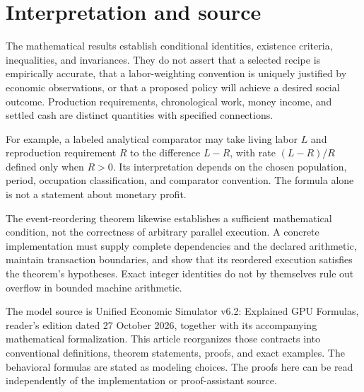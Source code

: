 \documentclass[11pt,a4paper]{article}
\begin{document}
\section{Interpretation and source}
The mathematical results establish conditional identities, existence criteria, inequalities, and invariances. They do not assert that a selected recipe is empirically accurate, that a labor-weighting convention is uniquely justified by economic observations, or that a proposed policy will achieve a desired social outcome. Production requirements, chronological work, money income, and settled cash are distinct quantities with specified connections.

For example, a labeled analytical comparator may take living labor $L$ and reproduction requirement $R$ to the difference $L-R$, with rate $(L-R)/R$ defined only when $R>0$. Its interpretation depends on the chosen population, period, occupation classification, and comparator convention. The formula alone is not a statement about monetary profit.

The event-reordering theorem likewise establishes a sufficient mathematical condition, not the correctness of arbitrary parallel execution. A concrete implementation must supply complete dependencies and the declared arithmetic, maintain transaction boundaries, and show that its reordered execution satisfies the theorem's hypotheses. Exact integer identities do not by themselves rule out overflow in bounded machine arithmetic.

The model source is Unified Economic Simulator v6.2: Explained GPU Formulas, reader's edition dated 27 October 2026, together with its accompanying mathematical formalization. This article reorganizes those contracts into conventional definitions, theorem statements, proofs, and exact examples. The behavioral formulas are stated as modeling choices. The proofs here can be read independently of the implementation or proof-assistant source.
\end{document}
